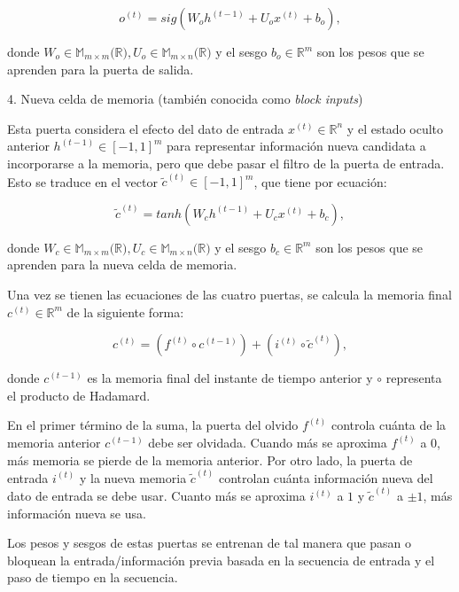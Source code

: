 \documentclass[12pt,twoside]{article}
\begin{document}
 \begin{equation}
 o^{(t)} = sig(W_oh^{(t-1)} + U_ox^{(t)} +  b_o),  
 \end{equation}

donde $W_o \in \mathbb{M}_{m \times m}(\mathbb{R)}, U_o \in \mathbb{M}_{m \times n}(\mathbb{R)}$ y el sesgo $b_o \in \mathbb{R}^m$ son los pesos que se aprenden para la puerta de salida.

\vspace{0.5em}
\noindent\textnormal{\large 4. Nueva celda de memoria (también conocida como \textit{block inputs})}
\vspace{0.2em}

Esta puerta considera el efecto del dato de entrada $x^{(t)} \in \mathbb{R}^n$ y el estado oculto anterior $h^{(t-1)} \in [-1,1]^m$ para representar información nueva candidata a incorporarse a la memoria, pero que debe pasar el filtro de la puerta de entrada. Esto se traduce en el vector $\tilde{c}^{(t)} \in [-1,1]^m$, que tiene por ecuación:

\begin{equation}
\tilde{c}^{(t)} = tanh(W_ch^{(t-1)} + U_cx^{(t)} +  b_c),
\end{equation}

donde $W_c \in \mathbb{M}_{m \times m}(\mathbb{R)}, U_c \in \mathbb{M}_{m \times n}(\mathbb{R)}$ y el sesgo $b_c \in \mathbb{R}^m$ son los pesos que se aprenden para la nueva celda de memoria.


Una vez se tienen las ecuaciones de las cuatro puertas, se calcula la memoria final $c^{(t)} \in \mathbb{R}^m$ de la siguiente forma:

\begin{equation}
c^{(t)} = ( f^{(t)} \circ c^{(t-1)}) + (i^{(t)} \circ \tilde{c}^{(t)}),
\end{equation}

donde $c^{(t-1)}$ es la memoria final del instante de tiempo anterior y $\circ$ representa el producto de Hadamard.

En el primer término de la suma, la puerta del olvido $f^{(t)}$ controla cuánta de la memoria anterior $c^{(t-1)}$ debe ser olvidada. Cuando más se aproxima $f^{(t)}$ a 0, más memoria se pierde de la memoria anterior. Por otro lado, la puerta de entrada $i^{(t)}$ y la nueva memoria $\tilde{c}^{(t)}$ controlan cuánta información nueva del dato de entrada se debe usar. Cuanto más se aproxima $i^{(t)}$ a $1$ y $\tilde{c}^{(t)}$ a $\pm
1$, más información nueva se usa.

Los pesos y sesgos de estas puertas se entrenan de tal manera que pasan o bloquean la entrada/información previa basada en la secuencia de entrada y el paso de tiempo en la secuencia.
\end{document}
